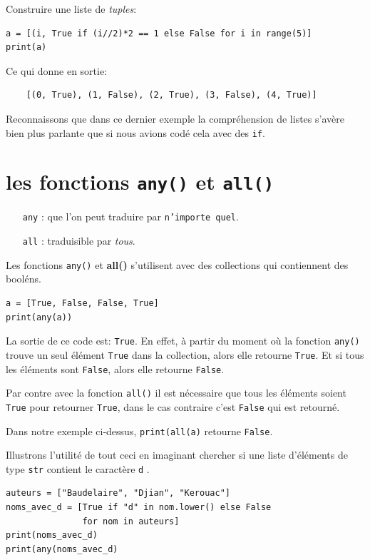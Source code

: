 \documentclass[a4paper,11pt]{book}
\begin{document}
Construire une liste de \textit{tuples}:
\begin{lstlisting}
a = [(i, True if (i//2)*2 == 1 else False for i in range(5)]
print(a)
\end{lstlisting}
\medskip

Ce qui donne en sortie:
\begin{verbatim}
    [(0, True), (1, False), (2, True), (3, False), (4, True)]
\end{verbatim}
\medskip

Reconnaissons que dans ce dernier exemple la compréhension de listes s'avère bien plus parlante que si nous avions codé cela avec des \texttt{if}.
\medskip

\section{les fonctions \texttt{any()} et \texttt{all()}}
\begin{itemize}
	\item[\texttt{any}]: que l'on peut traduire par \texttt{n'importe quel}.
	\item[\texttt{all}]: traduisible par \textit{tous}.
\end{itemize}
\medskip

Les fonctions \texttt{any()} et \textbf{all()} s'utilisent avec des collections qui contiennent des booléns.
\begin{lstlisting}
a = [True, False, False, True]
print(any(a))
\end{lstlisting}
\medskip

La sortie de ce code est: \texttt{True}. En effet, à partir du moment où la fonction \texttt{any()} trouve un seul élément \texttt{True} dans la collection, alors elle retourne \texttt{True}. Et si tous les éléments sont \texttt{False}, alors elle retourne \texttt{False}.
\medskip

Par contre avec la fonction \texttt{all()} il est nécessaire que tous les éléments soient \texttt{True} pour retourner \texttt{True}, dans le cas contraire c'est \texttt{False} qui est retourné.
\medskip

Dans notre exemple ci-dessus, \texttt{print(all(a)} retourne \texttt{False}.
\medskip

Illustrons l'utilité de tout ceci en imaginant chercher si une liste d'éléments de type \texttt{str} contient le caractère \og \texttt{d} \fg{}. 
\begin{lstlisting}
auteurs = ["Baudelaire", "Djian", "Kerouac"]
noms_avec_d = [True if "d" in nom.lower() else False 
               for nom in auteurs]
print(noms_avec_d)
print(any(noms_avec_d)
\end{lstlisting}
\medskip
\end{document}
